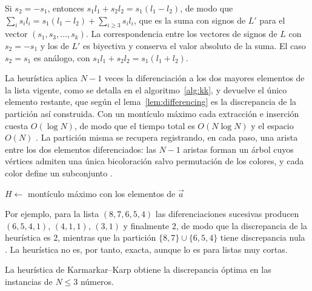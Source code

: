 \begin{demostracion}
Si $s_2 = -s_1$, entonces $s_1 l_1 + s_2 l_2 = s_1(l_1 - l_2)$, de modo que $\sum_i s_i l_i = s_1 (l_1 - l_2) + \sum_{i \geq 3} s_i l_i$, que es la suma con signos de $L'$ para el vector $(s_1, s_3, \ldots, s_k)$. La correspondencia entre los vectores de signos de $L$ con $s_2 = -s_1$ y los de $L'$ es biyectiva y conserva el valor absoluto de la suma. El caso $s_2 = s_1$ es análogo, con $s_1 l_1 + s_2 l_2 = s_1(l_1 + l_2)$.
\end{demostracion}

La heurística aplica $N - 1$ veces la diferenciación a los dos mayores elementos de la lista vigente, como se detalla en el algoritmo~\ref{alg:kk}, y devuelve el único elemento restante, que según el lema~\ref{lem:differencing} es la discrepancia de la partición así construida. Con un montículo máximo cada extracción e inserción cuesta $O(\log N)$, de modo que el tiempo total es $O(N \log N)$ y el espacio $O(N)$ \parencite{mertens2001}. La partición misma se recupera registrando, en cada paso, una arista entre los dos elementos diferenciados: las $N - 1$ aristas forman un árbol cuyos vértices admiten una única bicoloración salvo permutación de los colores, y cada color define un subconjunto \parencite{johnson1991}.

\begin{algorithm}[H]
\caption{Heurística de diferenciación de Karmarkar--Karp}\label{alg:kk}
$H \leftarrow$ montículo máximo con los elementos de $\vec{a}$\;
\;
\end{algorithm}

Por ejemplo, para la lista $(8, 7, 6, 5, 4)$ las diferenciaciones sucesivas producen $(6, 5, 4, 1)$, $(4, 1, 1)$, $(3, 1)$ y finalmente $2$, de modo que la discrepancia de la heurística es $2$, mientras que la partición $\{8, 7\} \cup \{6, 5, 4\}$ tiene discrepancia nula \parencite{gent1998}. La heurística no es, por tanto, exacta, aunque lo es para listas muy cortas.

\begin{theorem}\label{thm:kk-small}
La heurística de Karmarkar--Karp obtiene la discrepancia óptima en las instancias de $N \leq 3$ números.
\end{theorem}

